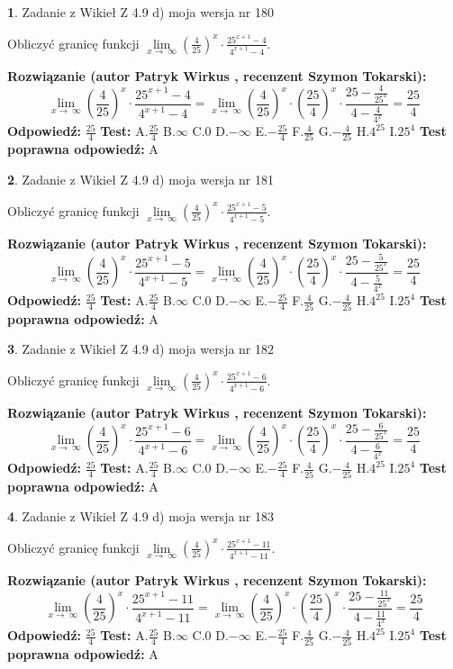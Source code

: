 \documentclass[12pt, a4paper]{article}
\theoremstyle{definition} %
\newtheorem{zad}{}
\newcommand{\zadStart}[1]{\begin{zad}#1\newline}
\newcommand{\zadStop}{\end{zad}}
\newcommand{\rozwStart}[2]{\noindent \textbf{Rozwiązanie (autor #1 , recenzent #2): }\newline}
\newcommand{\rozwStop}{\newline}
\newcommand{\odpStart}{\noindent \textbf{Odpowiedź:}\newline}
\newcommand{\odpStop}{\newline}
\newcommand{\testStart}{\noindent \textbf{Test:}\newline}
\newcommand{\testStop}{\newline}
\newcommand{\kluczStart}{\noindent \textbf{Test poprawna odpowiedź:}\newline}
\newcommand{\kluczStop}{\newline}
\begin{document}
\zadStart{Zadanie z Wikieł Z 4.9 d) moja wersja nr 180}


Obliczyć granicę funkcji  $\lim\limits_{x\to\ \infty}(\frac{4}{25})^{x}\cdot\frac{25^{x+1}-4}{4^{x+1}-4}$.
\zadStop
\rozwStart{Patryk Wirkus}{Szymon Tokarski}
$$\lim\limits_{x\to\ \infty}(\frac{4}{25})^{x}\cdot\frac{25^{x+1}-4}{4^{x+1}-4}=\lim\limits_{x\to\ \infty}(\frac{4}{25})^{x}\cdot(\frac{25}{4})^{x} \cdot \frac{25-\frac{4}{25^{x}}}{4-\frac{4}{4^{x}}} = \frac{25}{4}$$
\rozwStop
\odpStart
$\frac{25}{4}$
\odpStop
\testStart
A.$\frac{25}{4}$ B.$\infty$ C.$0$ D.$-\infty$ E.$-\frac{25}{4}$
F.$\frac{4}{25}$ G.$-\frac{4}{25}$
H.$4^{25}$
I.$25^{4}$
\testStop
\kluczStart
A
\kluczStop



\zadStart{Zadanie z Wikieł Z 4.9 d) moja wersja nr 181}


Obliczyć granicę funkcji  $\lim\limits_{x\to\ \infty}(\frac{4}{25})^{x}\cdot\frac{25^{x+1}-5}{4^{x+1}-5}$.
\zadStop
\rozwStart{Patryk Wirkus}{Szymon Tokarski}
$$\lim\limits_{x\to\ \infty}(\frac{4}{25})^{x}\cdot\frac{25^{x+1}-5}{4^{x+1}-5}=\lim\limits_{x\to\ \infty}(\frac{4}{25})^{x}\cdot(\frac{25}{4})^{x} \cdot \frac{25-\frac{5}{25^{x}}}{4-\frac{5}{4^{x}}} = \frac{25}{4}$$
\rozwStop
\odpStart
$\frac{25}{4}$
\odpStop
\testStart
A.$\frac{25}{4}$ B.$\infty$ C.$0$ D.$-\infty$ E.$-\frac{25}{4}$
F.$\frac{4}{25}$ G.$-\frac{4}{25}$
H.$4^{25}$
I.$25^{4}$
\testStop
\kluczStart
A
\kluczStop



\zadStart{Zadanie z Wikieł Z 4.9 d) moja wersja nr 182}


Obliczyć granicę funkcji  $\lim\limits_{x\to\ \infty}(\frac{4}{25})^{x}\cdot\frac{25^{x+1}-6}{4^{x+1}-6}$.
\zadStop
\rozwStart{Patryk Wirkus}{Szymon Tokarski}
$$\lim\limits_{x\to\ \infty}(\frac{4}{25})^{x}\cdot\frac{25^{x+1}-6}{4^{x+1}-6}=\lim\limits_{x\to\ \infty}(\frac{4}{25})^{x}\cdot(\frac{25}{4})^{x} \cdot \frac{25-\frac{6}{25^{x}}}{4-\frac{6}{4^{x}}} = \frac{25}{4}$$
\rozwStop
\odpStart
$\frac{25}{4}$
\odpStop
\testStart
A.$\frac{25}{4}$ B.$\infty$ C.$0$ D.$-\infty$ E.$-\frac{25}{4}$
F.$\frac{4}{25}$ G.$-\frac{4}{25}$
H.$4^{25}$
I.$25^{4}$
\testStop
\kluczStart
A
\kluczStop



\zadStart{Zadanie z Wikieł Z 4.9 d) moja wersja nr 183}


Obliczyć granicę funkcji  $\lim\limits_{x\to\ \infty}(\frac{4}{25})^{x}\cdot\frac{25^{x+1}-11}{4^{x+1}-11}$.
\zadStop
\rozwStart{Patryk Wirkus}{Szymon Tokarski}
$$\lim\limits_{x\to\ \infty}(\frac{4}{25})^{x}\cdot\frac{25^{x+1}-11}{4^{x+1}-11}=\lim\limits_{x\to\ \infty}(\frac{4}{25})^{x}\cdot(\frac{25}{4})^{x} \cdot \frac{25-\frac{11}{25^{x}}}{4-\frac{11}{4^{x}}} = \frac{25}{4}$$
\rozwStop
\odpStart
$\frac{25}{4}$
\odpStop
\testStart
A.$\frac{25}{4}$ B.$\infty$ C.$0$ D.$-\infty$ E.$-\frac{25}{4}$
F.$\frac{4}{25}$ G.$-\frac{4}{25}$
H.$4^{25}$
I.$25^{4}$
\testStop
\kluczStart
A
\kluczStop
\end{document}
